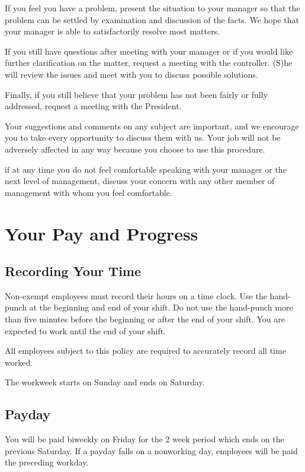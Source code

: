 If you feel you have a problem, present the situation to your manager so that the problem can be settled by examination and discussion of the facts. We hope that your manager is able to satisfactorily resolve most matters.

If you still have questions after meeting with your manager or if you would like further clarification on the matter, request a meeting with the controller. (S)he will review the issues and meet with you to discuss possible solutions.

Finally, if you still believe that your problem has not been fairly or fully addressed, request a meeting with the President.

Your suggestions and comments on any subject are important, and we encourage you to take every opportunity to discuss them with us. Your job will not be adversely affected in any way because you choose to use this procedure.

if at any time you do not feel comfortable speaking with your manager or the next level of management, discuss your concern with any other member of management with whom you feel comfortable.

\section{Your Pay and Progress}

\subsection{Recording Your Time}

Non-exempt employees must record their hours on a time clock. Use the hand-punch at the beginning and end of your shift. Do not use the hand-punch more than five minutes before the beginning or after the end of your shift. You are expected to work until the end of your shift. 

All employees subject to this policy are required to accurately record all time worked.

The workweek starts on Sunday and ends on Saturday.

\subsection{Payday}

You will be paid biweekly on Friday for the 2 week period which ends on the previous Saturday. If a payday falls on a nonworking day, employees will be paid the preceding workday.

